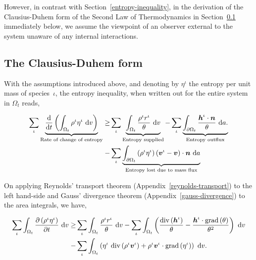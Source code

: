 \noindent However, in contrast with Section~\ref{entropy-inequality},
in the derivation of the Clausius-Duhem form of the Second Law of
Thermodynamics in Section~\ref{eu-clausius-duhem-form} immediately
below, we assume the viewpoint of an observer external to the system
unaware of any internal interactions.

\subsection{The Clausius-Duhem form}
\label{eu-clausius-duhem-form}

With the assumptions introduced above, and denoting by $\eta^\iota$
the entropy per unit mass of species~$\iota$, the entropy inequality,
when written out for the entire system in $\Omega_{t}$ reads,

\begin{equation}
\begin{split}
\sum\limits_{\iota}
\underbrace{\frac{\mathrm{d}}{\mathrm{d}t}\left(\int_{\Omega_{t}}
  \rho^{\iota} \eta^{\iota}\ \mathrm{d}v \right)}_{\text{Rate of
    change of entropy}} \geq & \sum\limits_{\iota}
\underbrace{\int_{\Omega_{t}} \frac{ \rho^{\iota}
    r^{\iota}}{\theta}\ \mathrm{d}v}_{\text{Entropy supplied}} -
\sum\limits_{\iota} \underbrace{\int_{\partial \Omega_{t}}
  \frac{\mbox{\boldmath$ h$}^{\iota}\cdot\mbox{\boldmath$ n$}}{\theta}\ \mathrm{d}a.}_{\text{Entropy
    outflux}} \\ - & \sum\limits_{\iota} \underbrace{\int_{\partial
    \Omega_{t}} \left(\rho^{\iota} \eta^{\iota} \right)
  \left(\mbox{\boldmath$ v$}^{\iota} - \mbox{\boldmath$ v$}\right) \cdot
  \mbox{\boldmath$ n$}\ \mathrm{d}a}_{\text{Entropy lost due to mass flux}}
\end{split}
\label{eu-globalbalanceofentropy}
\end{equation}

On applying Reynolds' transport theorem
(Appendix~\ref{reynolds-transport}) to the left hand-side and Gauss'
divergence theorem (Appendix~\ref{gauss-divergence}) to the area
integrals, we have,

\begin{equation*}
\begin{split}
\sum\limits_{\iota} \int_{\Omega_{t}} \frac{\partial
  \left(\rho^{\iota} \eta^{\iota}\right) }{\partial t} \ \mathrm{d}v
\geq & \sum\limits_{\iota} \int_{\Omega_{t}} \frac{ \rho^{\iota}
  r^{\iota}}{\theta}\ \mathrm{d}v - \sum\limits_{\iota}
\int_{\Omega_{t}} \left(
\frac{\mathrm{div}\left(\mbox{\boldmath$ h$}^{\iota}\right)}{\theta} -
\frac{\mbox{\boldmath$ h$}^{\iota}\cdot\mathrm{grad}\left(\theta\right)}{\theta^{2}}
\right)\ \mathrm{d}v \\ - & \sum\limits_{\iota} \int_{\Omega_{t}}
\left( \eta^{\iota}\ \mathrm{div} \left(\rho^{\iota}\mbox{\boldmath$ v$}^{\iota}
\right) +
\rho^{\iota}\mbox{\boldmath$ v$}^{\iota}\cdot\mathrm{grad}\left(\eta^{\iota}\right)
\right)\ \mathrm{d}v.
\end{split}
\end{equation*}

